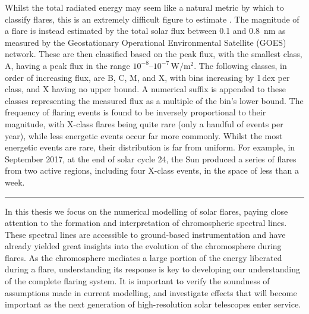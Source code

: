 Whilst the total radiated energy may seem like a natural metric by which to classify flares, this is an extremely difficult figure to estimate \citep[e.g.][]{Milligan2014}.
The magnitude of a flare is instead estimated by the total solar flux between 0.1 and \SI{0.8}{\nano\metre} as measured by the Geostationary Operational Environmental Satellite (GOES) network.
These are then classified based on the peak flux, with the smallest class, A, having a peak flux in the range $10^{-8}$--$10^{-7}\,\si{\watt\per\square\m}$.
The following classes, in order of increasing flux, are B, C, M, and X, with bins increasing by 1\,dex per class, and X having no upper bound.
A numerical suffix is appended to these classes representing the measured flux as a multiple of the bin's lower bound.
The frequency of flaring events is found to be inversely proportional to their magnitude, with X-class flares being quite rare (only a handful of events per year), while less energetic events occur far more commonly.
Whilst the most energetic events are rare, their distribution is far from uniform.
For example, in September 2017, at the end of solar cycle 24, the Sun produced a series of flares from two active regions, including four X-class events, in the space of less than a week.


\begin{center}
    \rule{0.5\textwidth}{0.6pt}
\end{center}

In this thesis we focus on the numerical modelling of solar flares, paying close attention to the formation and interpretation of chromospheric spectral lines.
These spectral lines are accessible to ground-based instrumentation and have already yielded great insights into the evolution of the chromosphere during flares.
As the chromosphere mediates a large portion of the energy liberated during a flare, understanding its response is key to developing our understanding of the complete flaring system.
It is important to verify the soundness of assumptions made in current modelling, and investigate effects that will become important as the next generation of high-resolution solar telescopes enter service.

